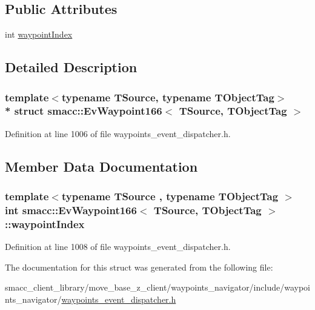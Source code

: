 \subsection*{Public Attributes}
\begin{DoxyCompactItemize}
\item 
int \hyperlink{structsmacc_1_1EvWaypoint166_adfc15f572734a0c752f2eb9ea6ec74aa}{waypoint\+Index}
\end{DoxyCompactItemize}


\subsection{Detailed Description}
\subsubsection*{template$<$typename T\+Source, typename T\+Object\+Tag$>$\\*
struct smacc\+::\+Ev\+Waypoint166$<$ T\+Source, T\+Object\+Tag $>$}



Definition at line 1006 of file waypoints\+\_\+event\+\_\+dispatcher.\+h.



\subsection{Member Data Documentation}
\subsubsection[{\texorpdfstring{waypoint\+Index}{waypointIndex}}]{\setlength{\rightskip}{0pt plus 5cm}template$<$typename T\+Source , typename T\+Object\+Tag $>$ int {\bf smacc\+::\+Ev\+Waypoint166}$<$ T\+Source, T\+Object\+Tag $>$\+::waypoint\+Index}\hypertarget{structsmacc_1_1EvWaypoint166_adfc15f572734a0c752f2eb9ea6ec74aa}{}\label{structsmacc_1_1EvWaypoint166_adfc15f572734a0c752f2eb9ea6ec74aa}


Definition at line 1008 of file waypoints\+\_\+event\+\_\+dispatcher.\+h.



The documentation for this struct was generated from the following file\+:\begin{DoxyCompactItemize}
\item 
smacc\+\_\+client\+\_\+library/move\+\_\+base\+\_\+z\+\_\+client/waypoints\+\_\+navigator/include/waypoints\+\_\+navigator/\hyperlink{waypoints__event__dispatcher_8h}{waypoints\+\_\+event\+\_\+dispatcher.\+h}\end{DoxyCompactItemize}
